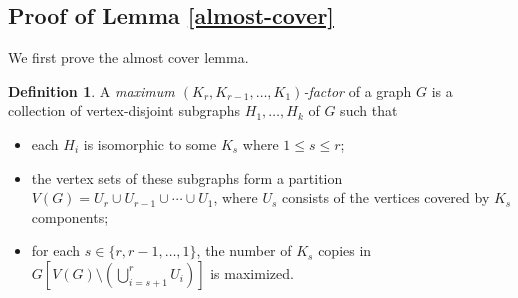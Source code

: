 \documentclass[11pt, a4paper]{article}
\theoremstyle{definition}
\newtheorem{definition}[theorem]{Definition}
\newcommand{\<}{\subseteq}
\begin{document}
\subsection{Proof of Lemma \ref{almost-cover}}\label{section4.2}

We first prove the almost cover lemma. 

\begin{definition}\label{maximum-factor}
    A \textit{maximum $(K_r,K_{r-1},\ldots,K_1)$-factor} of a graph $G$ is a collection of vertex-disjoint subgraphs ${H_1, \ldots, H_k}$ of $G$ such that
\begin{itemize}
    \item each $H_i$ is isomorphic to some $K_s$ where $1 \leq s \leq r$; 
    \item the vertex sets of these subgraphs form a partition $V(G) = U_r \cup U_{r-1} \cup \cdots \cup U_1$, where $U_s$ consists of the vertices covered by $K_s$ components;
    \item for each $s\in \{r,r-1,\ldots,1\}$, the number of $K_s$ copies in $G\left[V(G) \setminus \left( \bigcup_{i=s+1}^r U_i \right) \right]$ is maximized.
\end{itemize}
\end{definition}
\end{document}
